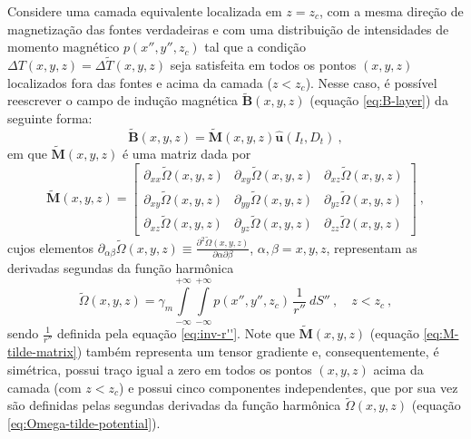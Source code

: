 Considere uma camada equivalente localizada em $z = z_{c}$, com a mesma direção de magnetização 
das fontes verdadeiras e com uma distribuição de intensidades de momento magnético $p(x'', y'', z_{c})$
tal que a condição $\Delta T(x, y, z) = \Delta \tilde{T}(x, y, z)$ seja satisfeita em todos os pontos 
$(x, y, z)$ localizados fora das fontes e acima da camada ($z < z_{c}$).
Nesse caso, é possível reescrever o campo de indução magnética $\tilde{\mathbf{B}}(x, y, z)$
(equação \ref{eq:B-layer}) da seguinte forma:
\begin{equation}
\tilde{\mathbf{B}}(x, y, z) = \tilde{\mathbf{M}}(x, y, z) \hat{\mathbf{u}}(I_{t}, D_{t}) \: ,
\label{eq:B-layer-alternative}
\end{equation}
em que $\tilde{\mathbf{M}}(x, y, z)$ é uma matriz dada por
\begin{equation}
	\tilde{\mathbf{M}}(x, y, z) = \begin{bmatrix}
		\partial_{xx} \tilde{\Omega}(x, y, z) & 
		\partial_{xy} \tilde{\Omega}(x, y, z) &
		\partial_{xz} \tilde{\Omega}(x, y, z) \\
		\partial_{xy} \tilde{\Omega}(x, y, z) & 
		\partial_{yy} \tilde{\Omega}(x, y, z) &
		\partial_{yz} \tilde{\Omega}(x, y, z) \\
		\partial_{xz} \tilde{\Omega}(x, y, z) & 
		\partial_{yz} \tilde{\Omega}(x, y, z) &
		\partial_{zz} \tilde{\Omega}(x, y, z)
	\end{bmatrix} \: ,
	\label{eq:M-tilde-matrix}
\end{equation}
cujos elementos $\partial_{\alpha\beta} \tilde{\Omega}(x, y, z) \equiv 
\frac{\partial^{2} \tilde{\Omega}(x, y, z)}{\partial \alpha \partial \beta}$, 
$\alpha, \beta = x, y, z$, representam as derivadas segundas da função harmônica 
\begin{equation}
\tilde{\Omega}(x, y, z) = \gamma_{m} \int\limits_{-\infty}^{+\infty}\int\limits_{-\infty}^{+\infty} 
p(x'', y'', z_{c}) \, \frac{1}{r''} \: dS'' \: , \quad z < z_{c} \: ,
\label{eq:Omega-tilde-potential}
\end{equation}
sendo $\frac{1}{r''}$ definida pela equação \ref{eq:inv-r''}.
Note que $\tilde{\mathbf{M}}(x, y, z)$ (equação \ref{eq:M-tilde-matrix}) também representa um tensor gradiente 
\citep{pedersen_rasmussen1990} e, consequentemente, é simétrica, possui traço igual a zero em todos os pontos 
$(x,y,z)$ acima da camada (com $z < z_{c}$) e possui cinco componentes independentes, que por sua vez são 
definidas pelas segundas derivadas da função harmônica 
$\tilde{\Omega}(x, y, z)$ (equação \ref{eq:Omega-tilde-potential}).
